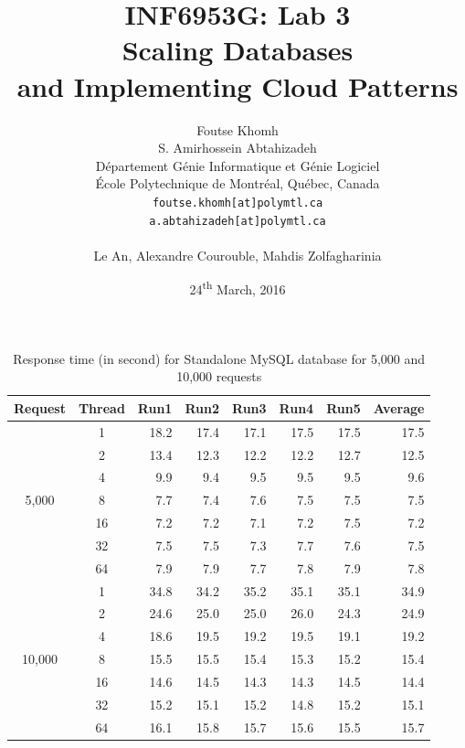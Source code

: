 \documentclass{article}
\title{INF6953G: Lab 3 \\Scaling Databases \\and Implementing Cloud Patterns}
\author{
    Foutse Khomh \\
    S. Amirhossein Abtahizadeh \\
    D\'{e}partement G\'{e}nie Informatique et G\'{e}nie Logiciel \\
    \'{E}cole Polytechnique de Montr\'{e}al, Qu\'{e}bec, Canada \\
    \texttt{foutse.khomh[at]polymtl.ca} \\
    \texttt{a.abtahizadeh[at]polymtl.ca}\\
    {} \\
    Le An, Alexandre Courouble, Mahdis Zolfagharinia
}
\date{24\textsuperscript{th} March, 2016}
\begin{document}
\maketitle


\begin{table}[t]
	\centering
	\caption{Response time (in second) for Standalone MySQL database for 5,000 and 10,000 requests}
	\label{tab:standalone}
	\begin{tabular}{|c|c|r|r|r|r|r|r|}
		\hline
		\textbf{Request} & \textbf{Thread} & \textbf{Run1} & \textbf{Run2} & \textbf{Run3} & \textbf{Run4} & \textbf{Run5} & \textbf{Average}\\ \hline
		\multirow{7}{*}{5,000} & 1 & 18.2 & 17.4  & 17.1 & 17.5 & 17.5 & 17.5 \\ \cline{2-8}
		{} & 2 & 13.4   & 12.3   & 12.2 & 12.2 & 12.7 & 12.5 \\ \cline{2-8}
		{} & 4 & 9.9  & 9.4  & 9.5   & 9.5  & 9.5  & 9.6  \\ \cline{2-8}
		{} & 8 & 7.7  & 7.4   & 7.6  & 7.5  & 7.5  & 7.5  \\ \cline{2-8}
		{} & 16 & 7.2  & 7.2  & 7.1  & 7.2   & 7.5  & 7.2  \\ \cline{2-8}
		{} & 32 & 7.5  & 7.5  & 7.3  & 7.7  & 7.6  & 7.5  \\ \cline{2-8}
		{} & 64 & 7.9 & 7.9  & 7.7   & 7.8  & 7.9   & 7.8  \\ \hline
		\multirow{7}{*}{10,000} & 1 & 34.8 & 34.2 & 35.2 & 35.1   & 35.1 & 34.9 \\ \cline{2-8}
		{} & 2 & 24.6 & 25.0 & 25.0 & 26.0 & 24.3 & 24.9   \\ \cline{2-8}
		{} & 4 & 18.6 & 19.5 & 19.2 & 19.5 & 19.1 & 19.2 \\ \cline{2-8}
		{} & 8 & 15.5 & 15.5 & 15.4 & 15.3 & 15.2 & 15.4 \\ \cline{2-8}
		{} & 16 & 14.6 & 14.5 & 14.3  & 14.3 & 14.5 & 14.4  \\ \cline{2-8}
		{} & 32 & 15.2 & 15.1 & 15.2 & 14.8 & 15.2  & 15.1  \\ \cline{2-8}
		{} & 64 & 16.1 & 15.8 & 15.7 & 15.6 & 15.5 & 15.7 \\ \hline
	\end{tabular}
\end{table}
\end{document}
